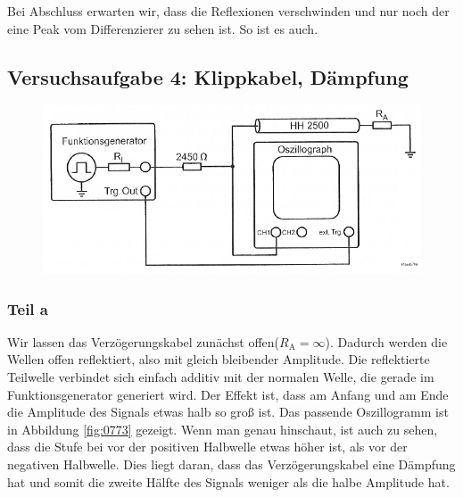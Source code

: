 Bei Abschluss erwarten wir, dass die Reflexionen verschwinden und nur noch der
eine Peak vom Differenzierer zu sehen ist. So ist es auch.

\FloatBarrier
\subsection{Versuchsaufgabe 4: Klippkabel, Dämpfung}

\begin{figure}[htbp]
	\centering
	\includegraphics[width=\textwidth]{Schaltplan/1-9.png}
	\caption{%
		\cite[Abbildung~1.9]{physik313-Anleitung}
	}
	\label{fig:1-9}
\end{figure}

\FloatBarrier
\subsubsection{Teil a}

Wir lassen das Verzögerungskabel zunächst offen($R_\text{A}=\infty$). Dadurch
werden die Wellen offen reflektiert, also mit gleich bleibender Amplitude. Die
reflektierte Teilwelle verbindet sich einfach additiv mit der normalen Welle,
die gerade im Funktionsgenerator generiert wird. Der Effekt ist, dass am Anfang
und am Ende die Amplitude des Signals etwas halb so groß ist. Das passende
Oszillogramm ist in Abbildung \ref{fig:0773} gezeigt. Wenn man genau hinschaut,
ist auch zu sehen, dass die Stufe bei vor der positiven Halbwelle etwas höher
ist, als vor der negativen Halbwelle. Dies liegt daran, dass das
Verzögerungskabel eine Dämpfung hat und somit die zweite Hälfte des Signals
weniger als die halbe Amplitude hat.

